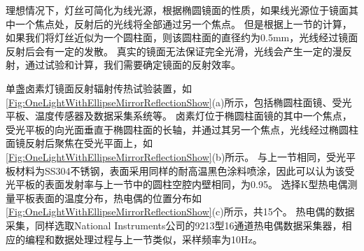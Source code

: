 理想情况下，灯丝可简化为线光源，根据椭圆镜面的性质，如果线光源位于镜面其中一个焦点处，反射后的光线将全部通过另一个焦点。
但是根据上一节的计算，如果我们将灯丝近似为一个圆柱面，则该圆柱面的直径约为0.5mm，光线经过镜面反射后会有一定的发散。
真实的镜面无法保证完全光滑，光线会产生一定的漫反射，通过试验和计算，我们需要确定镜面的反射效率。

单盏卤素灯镜面反射辐射传热试验装置，如\ref{Fig:OneLightWithEllipseMirrorReflectionShow}(a)所示，包括椭圆柱面镜、受光平板、温度传感器及数据采集系统等。
卤素灯位于椭圆柱面镜的其中一个焦点，受光平板的向光面垂直于椭圆柱面的长轴，并通过其另一个焦点，光线经过椭圆柱面镜反射后聚焦在受光平面上，如\ref{Fig:OneLightWithEllipseMirrorReflectionShow}(b)所示。
与上一节相同，受光平板材料为SS304不锈钢，表面采用同样的耐高温黑色涂料喷涂，因此可以认为该受光平板的表面发射率与上一节中的圆柱空腔内壁相同，为0.95。
选择K型热电偶测量平板表面的温度分布，热电偶的位置分布如\ref{Fig:OneLightWithEllipseMirrorReflectionShow}(c)所示，共15个。
热电偶的数据采集，同样选取National Instruments公司的9213型16通道热电偶数据采集器，相应的编程和数据处理过程与上一节类似，采样频率为10Hz。

